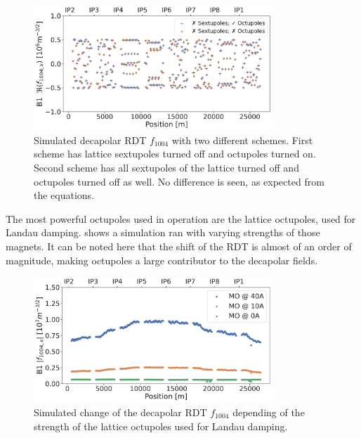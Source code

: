 \begin{figure}[!htb]
    \centering
    \includegraphics[width=0.8\textwidth]{./images/f1004/f1004_no_ms.pdf}
    \caption{Simulated decapolar RDT $f_{1004}$ with two different schemes. First scheme has
    lattice sextupoles turned off and octupoles turned on. Second scheme has all sextupoles of the
    lattice turned off and octupoles turned off as well. No difference is seen, as expected from
    the equations.}
    \label{fig:decapoles:rdts:sectupole_octupole_no_diff}
\end{figure}

The most powerful octupoles used in operation are the lattice octupoles, used for Landau damping.
 shows a simulation ran with varying strengths of
those magnets. It can be noted here that the shift of the RDT is almost of an order of magnitude,
making octupoles a large contributor to the decapolar fields.

\begin{figure}[!htb]
    \centering
    \includegraphics[width=0.8\textwidth]{./images/f1004/f1004_mo.pdf}
    \caption{Simulated change of the decapolar RDT $f_{1004}$ depending of the strength of the
    lattice octupoles used for Landau damping.}
    \label{fig:decapoles:rdts:simulation_mo_powered}
\end{figure}


